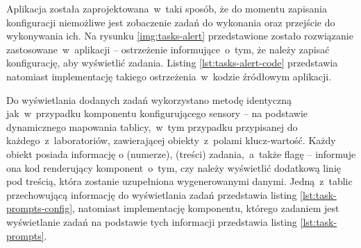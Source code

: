 Aplikacja została zaprojektowana~w~taki sposób, że do momentu zapisania konfiguracji niemożliwe jest
zobaczenie zadań do wykonania oraz przejście do wykonywania ich. Na rysunku \ref{img:tasks-alert}
przedstawione zostało rozwiązanie zastosowane~w~aplikacji -- ostrzeżenie informujące~o~tym, że
należy zapisać konfigurację, aby wyświetlić zadania. Listing \ref{lst:tasks-alert-code} przedstawia
natomiast implementację takiego ostrzeżenia~w~kodzie źródłowym aplikacji.



Do wyświetlania dodanych zadań wykorzystano metodę identyczną jak~w~przypadku komponentu
konfigurującego sensory -- na podstawie dynamicznego mapowania tablicy,~w~tym przypadku przypisanej
do każdego~z~laboratoriów, zawierającej obiekty~z~polami klucz-wartość. Każdy obiekt posiada
informację o  (numerze),  (treści) zadania,~a~także flagę
 -- informuje ona kod renderujący komponent~o~tym, czy należy wyświetlić dodatkową
linię pod treścią, która zostanie uzupełniona wygenerowanymi danymi. Jedną~z~tablic przechowującą
informację do wyświetlania zadań przedstawia listing \ref{lst:task-prompts-config}, natomiast
implementację komponentu, którego zadaniem jest wyświetlanie zadań na podstawie tych informacji
przedstawia listing \ref{lst:task-prompts}.


